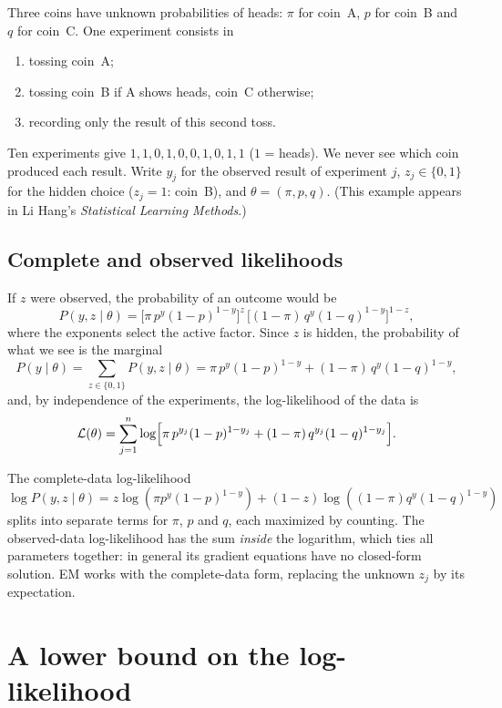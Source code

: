 \begin{notechapter}
Three coins have unknown probabilities of heads: $\pi$ for coin~A, $p$ for coin~B
and $q$ for coin~C. One experiment consists in
\begin{enumerate}[nosep]
  \item tossing coin~A;
  \item tossing coin~B if A shows heads, coin~C otherwise;
  \item recording only the result of this second toss.
\end{enumerate}
Ten experiments give $1, 1, 0, 1, 0, 0, 1, 0, 1, 1$ ($1$ = heads). We never see
which coin produced each result. Write $y_j$ for the observed result of
experiment $j$, $z_j\in\{0,1\}$ for the hidden choice ($z_j = 1$: coin~B), and
$\theta = (\pi, p, q)$. (This example appears in Li Hang's \emph{Statistical
Learning Methods}.)

\subsection{Complete and observed likelihoods}

If $z$ were observed, the probability of an outcome would be
\[
  P(y, z\mid\theta) = \bigl[\pi\,p^y(1-p)^{1-y}\bigr]^z\,\bigl[(1-\pi)\,q^y(1-q)^{1-y}\bigr]^{1-z},
\]
where the exponents select the active factor. Since $z$ is hidden, the probability
of what we see is the marginal
\[
  P(y\mid\theta) = \sum_{z\in\{0,1\}}P(y,z\mid\theta) = \pi\,p^y(1-p)^{1-y} + (1-\pi)\,q^y(1-q)^{1-y},
\]
and, by independence of the experiments, the log-likelihood of the data is
\[
  \mathcal L(\theta) = \sum_{j=1}^n\log\Bigl[\pi\,p^{y_j}(1-p)^{1-y_j} + (1-\pi)\,q^{y_j}(1-q)^{1-y_j}\Bigr].
\]

\begin{intuition}
The complete-data log-likelihood
$\log P(y,z\mid\theta) = z\log(\pi p^y(1-p)^{1-y}) + (1-z)\log((1-\pi)q^y(1-q)^{1-y})$
splits into separate terms for $\pi$, $p$ and $q$, each maximized by counting. The
observed-data log-likelihood has the sum \emph{inside} the logarithm, which ties
all parameters together: in general its gradient equations have no closed-form solution.
EM works with the complete-data form, replacing the unknown $z_j$ by its
expectation.
\end{intuition}

\section{A lower bound on the log-likelihood}\label{em-algorithm:sec:elbo}


\end{notechapter}
